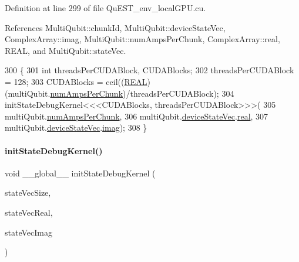 Definition at line 299 of file Qu\+E\+S\+T\+\_\+env\+\_\+local\+G\+P\+U.\+cu.



References Multi\+Qubit\+::chunk\+Id, Multi\+Qubit\+::device\+State\+Vec, Complex\+Array\+::imag, Multi\+Qubit\+::num\+Amps\+Per\+Chunk, Complex\+Array\+::real, R\+E\+AL, and Multi\+Qubit\+::state\+Vec.


\begin{DoxyCode}
300 \{
301     \textcolor{keywordtype}{int} threadsPerCUDABlock, CUDABlocks;
302     threadsPerCUDABlock = 128;
303     CUDABlocks = ceil((\mbox{\hyperlink{QuEST__precision_8h_a4b654506f18b8bfd61ad2a29a7e38c25}{REAL}})(multiQubit.\mbox{\hyperlink{structMultiQubit_a1cad83601a78635dd278259c7ed54f18}{numAmpsPerChunk}})/threadsPerCUDABlock);
304     initStateDebugKernel<<<CUDABlocks, threadsPerCUDABlock>>>(
305         multiQubit.\mbox{\hyperlink{structMultiQubit_a1cad83601a78635dd278259c7ed54f18}{numAmpsPerChunk}},
306         multiQubit.\mbox{\hyperlink{structMultiQubit_a59ac613486a41b8c9a4b6e79cc8d2cc3}{deviceStateVec}}.\mbox{\hyperlink{structComplexArray_a4195cac6c784ea1b6271f1c7dba1548a}{real}}, 
307         multiQubit.\mbox{\hyperlink{structMultiQubit_a59ac613486a41b8c9a4b6e79cc8d2cc3}{deviceStateVec}}.\mbox{\hyperlink{structComplexArray_a79dde47c7ae530c79cebfdf57b225968}{imag}});
308 \}
\end{DoxyCode}
\mbox{\label{QuEST__env__localGPU_8cu_a2f83bb3e7c5408d3a19161e9f0be6e35}} 
\paragraph{\texorpdfstring{init\+State\+Debug\+Kernel()}{initStateDebugKernel()}}
{\footnotesize\ttfamily void \+\_\+\+\_\+global\+\_\+\+\_\+ init\+State\+Debug\+Kernel (\begin{DoxyParamCaption}\item[{long long int}]{state\+Vec\+Size,  }\item[{\mbox{\hyperlink{QuEST__precision_8h_a4b654506f18b8bfd61ad2a29a7e38c25}{R\+E\+AL}} $\ast$}]{state\+Vec\+Real,  }\item[{\mbox{\hyperlink{QuEST__precision_8h_a4b654506f18b8bfd61ad2a29a7e38c25}{R\+E\+AL}} $\ast$}]{state\+Vec\+Imag }\end{DoxyParamCaption})}



